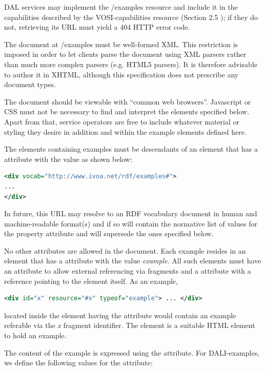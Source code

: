 \documentclass[11pt,letter]{ivoa}
\begin{document}
DAL services may implement the /examples resource and include it in the 
capabilities described by the VOSI-capabilities resource (Section 2.5 ); if they 
do not, retrieving its URL must yield a 404 HTTP error code.

The document at /examples must be well-formed XML. This restriction is imposed 
in order to let clients parse the document using XML parsers rather than 
much more complex parsers (e.g. HTML5 parsers). It is therefore advisable to 
author it in XHTML, although this specification does not prescribe any document 
types.

The document should be viewable with ``common web browsers''. Javascript or CSS 
must not be necessary to find and interpret the elements specified below.  Apart 
from that, service operators are free to include whatever material or styling 
they desire in addition and within the example elements defined here.

The elements containing examples must be descendants of an element that has a 
 attribute with the value as shown below:

\begin{lstlisting}[language=XML]
<div vocab="http://www.ivoa.net/rdf/examples#">
...
</div>
\end{lstlisting}

In future, this URL may resolve to an RDF vocabulary document in human and 
machine-readable format(s) and if so will contain the normative list of values 
for the property attribute and will supersede the ones specified below.

No other  attributes are allowed in the document. Each example resides in 
an element that has a  attribute with the value
\emph{example}. All such elements 
must have an  attribute to allow external referencing via fragments and a 
 attribute with a reference pointing to the element itself. As an 
example,

\begin{lstlisting}[language=XML]
<div id="x" resource="#x" typeof="example"> ... </div>
\end{lstlisting}

\noindent located inside the element having the  attribute would 
contain an example referable via the \emph{x} fragment identifier. The
 element is 
a suitable HTML element to hold an example.

The content of the example is expressed using the  attribute. For 
DALI-examples, we define the following values for the  attribute: 
\end{document}
